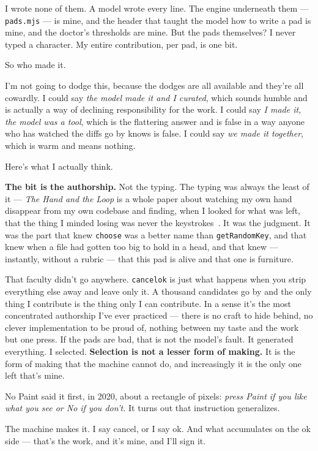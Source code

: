 \documentclass[10pt,letterpaper,twocolumn]{article}
\begin{document}
I wrote none of them. A model wrote every line. The engine underneath them --- \texttt{pads.mjs} --- is mine, and the header that taught the model how to write a pad is mine, and the doctor's thresholds are mine. But the pads themselves? I never typed a character. My entire contribution, per pad, is one bit.

So who made it.

I'm not going to dodge this, because the dodges are all available and they're all cowardly. I could say \emph{the model made it and I curated}, which sounds humble and is actually a way of declining responsibility for the work. I could say \emph{I made it, the model was a tool}, which is the flattering answer and is false in a way anyone who has watched the diffs go by knows is false. I could say \emph{we made it together}, which is warm and means nothing.

Here's what I actually think.

\textbf{The bit is the authorship.} Not the typing. The typing was always the least of it --- \emph{The Hand and the Loop} is a whole paper about watching my own hand disappear from my own codebase and finding, when I looked for what was left, that the thing I minded losing was never the keystrokes~\citep{scudder2026handloop}. It was the judgment. It was the part that knew \texttt{choose} was a better name than \texttt{getRandomKey}, and that knew when a file had gotten too big to hold in a head, and that knew --- instantly, without a rubric --- that this pad is alive and that one is furniture.

That faculty didn't go anywhere. \texttt{cancelok} is just what happens when you strip everything else away and leave only it. A thousand candidates go by and the only thing I contribute is the thing only I can contribute. In a sense it's the most concentrated authorship I've ever practiced --- there is no craft to hide behind, no clever implementation to be proud of, nothing between my taste and the work but one press. If the pads are bad, that is not the model's fault. It generated everything. I selected. \textbf{Selection is not a lesser form of making.} It is the form of making that the machine cannot do, and increasingly it is the only one left that's mine.

No Paint said it first, in 2020, about a rectangle of pixels: \emph{press Paint if you like what you see or No if you don't.} It turns out that instruction generalizes.

The machine makes it. I say cancel, or I say ok. And what accumulates on the ok side --- that's the work, and it's mine, and I'll sign it.
\end{document}
